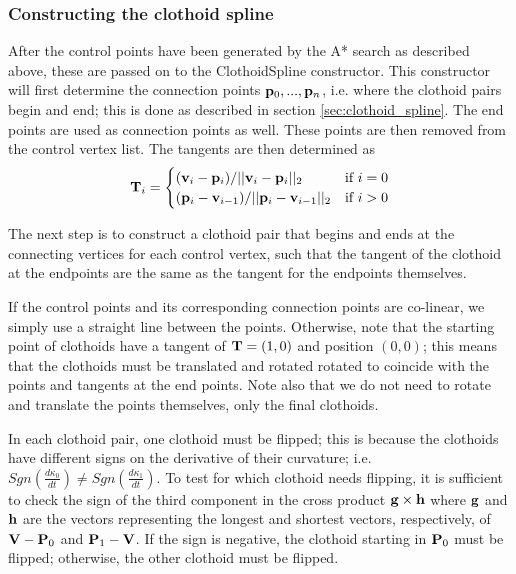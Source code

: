 \subsubsection{Constructing the clothoid spline}
After the control points have been generated by the A* search as described above, these are passed on to the ClothoidSpline constructor. This constructor will first determine the connection points ${\mathbf p}_0, ..., {\mathbf p}_n$, i.e. where the clothoid pairs begin and end; this is done as described in section \ref{sec:clothoid_spline}. The end points are used as connection points as well. These points are then removed from the control vertex list. The tangents are then determined as 
\begin{equation}
{\mathbf T}_i = 
\begin{cases}
({\mathbf v}_i - {\mathbf p}_i)/||{\mathbf v}_i - {\mathbf p}_i||_2 & \mbox{if $i = 0$}\\
({\mathbf p}_i - {\mathbf v}_{i-1})/||{\mathbf p}_i - {\mathbf v}_{i-1}||_2 & \mbox{if $i > 0$}
\end{cases}
\label{eq:connector_tangents}
\end{equation}

The next step is to construct a clothoid pair that begins and ends at the connecting vertices for each control vertex, such that the tangent of the clothoid at the endpoints are the same as the tangent for the endpoints themselves. 

If the control points and its corresponding connection points are co-linear, we simply use a straight line between the points. Otherwise, note that the starting point of clothoids have a tangent of ${\mathbf T} = (1,0)$ and position $(0,0)$; this means that the clothoids must be translated and rotated rotated  to coincide with the points and tangents at the end points. Note also that we do not need to rotate and translate the points themselves, only the final clothoids. 

In each clothoid pair, one clothoid must be flipped; this is because the clothoids have different signs on the derivative of their curvature; i.e. $Sgn(\frac{d\kappa_{0}}{dt})\neq Sgn(\frac{d\kappa_{1}}{dt})$.  To test for which clothoid needs flipping, it is sufficient to check the sign of the third component in the cross product ${\mathbf g}\times {\mathbf h}$ where ${\mathbf g}$ and ${\mathbf h}$ are the vectors representing the longest and shortest vectors, respectively, of ${\mathbf V}-{\mathbf P}_0$ and ${\mathbf P}_1 - {\mathbf V}$. If the sign is negative, the clothoid starting in ${\mathbf P}_0$ must be flipped; otherwise, the other clothoid must be flipped.

